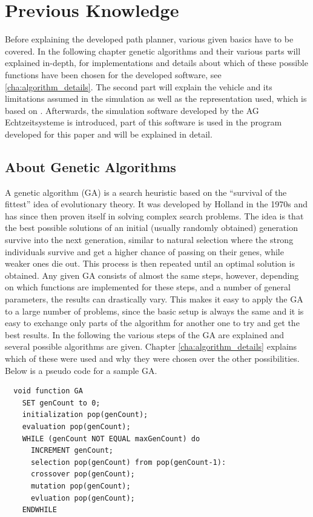 \chapter{Previous Knowledge}
\label{cha:previous_knowledge}

Before explaining the developed path planner, various given basics have to be covered. In the following chapter genetic algorithms and their various parts will explained in-depth, for implementations and details about which of these possible functions have been chosen for the developed software, see \ref{cha:algorithm_details}. The second part will explain the vehicle and its limitations assumed in the simulation as well as the representation used, which is based on \cite{12}. Afterwards, the simulation software developed by the AG Echtzeitsysteme is introduced, part of this software is used in the program developed for this paper and will be explained in detail.

\section{About Genetic Algorithms}
\label{sec:previous_knowledge_ga}

A genetic algorithm (GA) is a search heuristic based on the "`survival of the fittest"' idea of evolutionary theory. It was developed by Holland in the 1970s \cite{15} and has since then proven itself in solving complex search problems. The idea is that the best possible solutions of an initial (usually randomly obtained) generation survive into the next generation, similar to natural selection where the strong individuals survive and get a higher chance of passing on their genes, while weaker ones die out. This process is then repeated until an optimal solution is obtained. Any given GA consists of almost the same steps, however, depending on which functions are implemented for these steps, and a number of general parameters, the results can drastically vary. This makes it easy to apply the GA to a large number of problems, since the basic setup is always the same and it is easy to exchange only parts of the algorithm for another one to try and get the best results. In the following the various steps of the GA are explained and several possible algorithms are given. Chapter \ref{cha:algorithm_details} explains which of these were used and why they were chosen over the other possibilities. Below is a pseudo code for a sample GA.
\begin{verbatim}
  void function GA
    SET genCount to 0;
    initialization pop(genCount);
    evaluation pop(genCount);
    WHILE (genCount NOT EQUAL maxGenCount) do
      INCREMENT genCount;
      selection pop(genCount) from pop(genCount-1):
      crossover pop(genCount);
      mutation pop(genCount);
      evluation pop(genCount);
    ENDWHILE
\end{verbatim}

